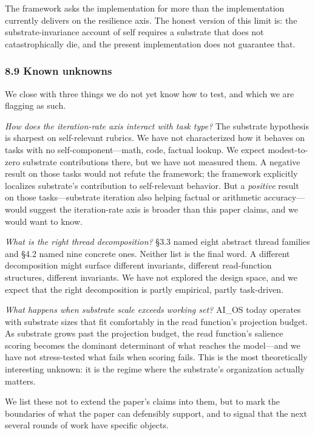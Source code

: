 \documentclass[11pt,letterpaper]{article}
\begin{document}
The framework asks the implementation for more than the implementation currently delivers on the resilience axis. The honest version of this limit is: the substrate-invariance account of self requires a substrate that does not catastrophically die, and the present implementation does not guarantee that.

\subsubsection*{8.9 Known unknowns}

We close with three things we do not yet know how to test, and which we are flagging as such.

\emph{How does the iteration-rate axis interact with task type?} The substrate hypothesis is sharpest on self-relevant rubrics. We have not characterized how it behaves on tasks with no self-component---math, code, factual lookup. We expect modest-to-zero substrate contributions there, but we have not measured them. A negative result on those tasks would not refute the framework; the framework explicitly localizes substrate's contribution to self-relevant behavior. But a \emph{positive} result on those tasks---substrate iteration also helping factual or arithmetic accuracy---would suggest the iteration-rate axis is broader than this paper claims, and we would want to know.

\emph{What is the right thread decomposition?} §3.3 named eight abstract thread families and §4.2 named nine concrete ones. Neither list is the final word. A different decomposition might surface different invariants, different read-function structures, different invariants. We have not explored the design space, and we expect that the right decomposition is partly empirical, partly task-driven.

\emph{What happens when substrate scale exceeds working set?} AI\_OS today operates with substrate sizes that fit comfortably in the read function's projection budget. As substrate grows past the projection budget, the read function's salience scoring becomes the dominant determinant of what reaches the model---and we have not stress-tested what fails when scoring fails. This is the most theoretically interesting unknown: it is the regime where the substrate's organization actually matters.

We list these not to extend the paper's claims into them, but to mark the boundaries of what the paper can defensibly support, and to signal that the next several rounds of work have specific objects.
\end{document}
